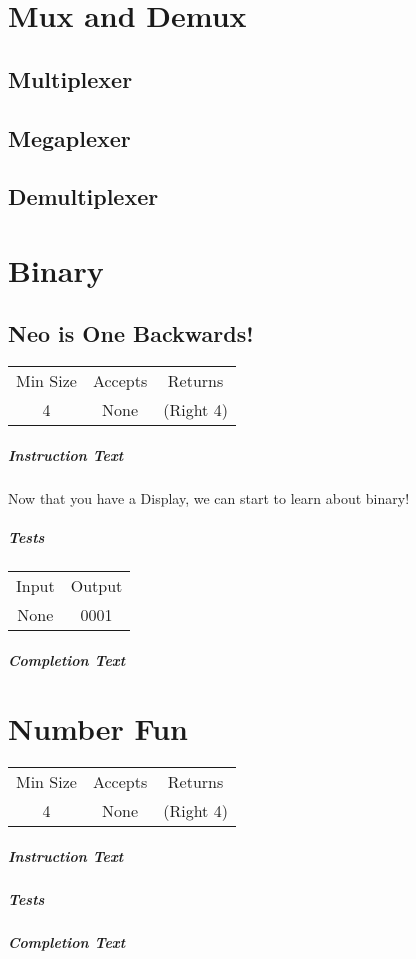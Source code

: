 ﻿\documentclass[a4paper, 12pt]{article}
\begin{document}
\section{Mux and Demux}

\subsection{Multiplexer}
\subsection{Megaplexer}
\subsection{Demultiplexer}
\subsection{}

\section{Binary}
\subsection{Neo is One Backwards!}
\begin{tabular}{ccc}
	Min Size & Accepts & Returns \\ 
	4 & None & (Right 4)
\end{tabular}

\subparagraph{Instruction Text}
Now that you have a Display, we can start to learn about binary! 

\subparagraph{Tests}
\begin{tabular}{cc}
	Input & Output \\ 
	None & 0001
\end{tabular}

\subparagraph{Completion Text}

\section{Number Fun}
\begin{tabular}{ccc}
	Min Size & Accepts & Returns \\
	4 & None & (Right 4)
\end{tabular}

\subparagraph{Instruction Text}

\subparagraph{Tests}


\subparagraph{Completion Text}
\end{document}
